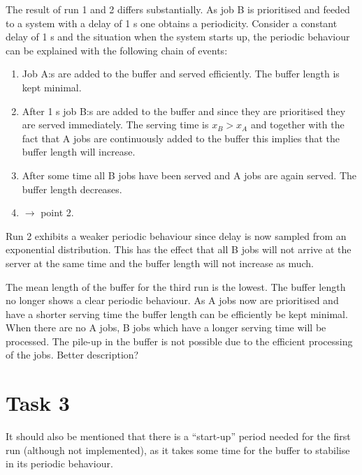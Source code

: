 \documentclass[]{article}
\begin{document}
The result of run 1 and 2 differs substantially.
As job B is prioritised and feeded to a system with a delay of 1 s one obtains a periodicity.
Consider a constant delay of 1 s and the situation when the system starts up, the periodic behaviour can be explained with the following chain of events:
\begin{enumerate}
  \item Job A:s are added to the buffer and served efficiently. The buffer length is kept minimal.
  \item After 1 s job B:s are added to the buffer and since they are prioritised they are served immediately. The serving time is $ x_B > x_A $ and together with the fact that A jobs are continuously added to the buffer this implies that the buffer length will increase.
  \item After some time all B jobs have been served and A jobs are again served. The buffer length decreases.
  \item $\rightarrow$ point 2.
\end{enumerate}
Run 2 exhibits a weaker periodic behaviour since delay is now sampled from an exponential distribution.
This has the effect that all B jobs will not arrive at the server at the same time and the buffer length will not increase as much.

The mean length of the buffer for the third run is the lowest.
The buffer length no longer shows a clear periodic behaviour.
As A jobs now are prioritised and have a shorter serving time the buffer length can be efficiently be kept minimal.
When there are no A jobs, B jobs which have a longer serving time will be processed.
The pile-up in the buffer is not possible due to the efficient processing of the jobs.
Better description?

\section{Task 3}





It should also be mentioned that there is a ``start-up'' period needed for the first run (although not implemented), as it takes some time for the buffer to stabilise in its periodic behaviour.
\end{document}
